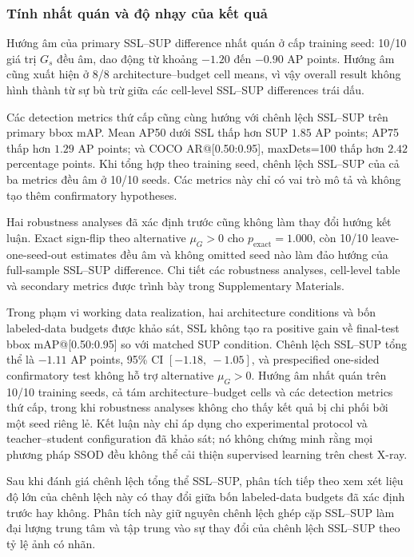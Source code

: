 \documentclass[pdflatex,sn-mathphys-num]{sn-jnl}%
\theoremstyle{thmstyleone}%
\theoremstyle{thmstyletwo}%
\theoremstyle{thmstylethree}%
\begin{document}
\subsubsection{Tính nhất quán và độ nhạy của kết quả}

Hướng âm của primary SSL--SUP difference nhất quán ở cấp training seed: 10/10 giá trị $G_s$ đều âm, dao động từ khoảng $-1.20$ đến $-0.90$ AP points. Hướng âm cũng xuất hiện ở 8/8 architecture--budget cell means, vì vậy overall result không hình thành từ sự bù trừ giữa các cell-level SSL--SUP differences trái dấu.

Các detection metrics thứ cấp cũng cùng hướng với chênh lệch SSL--SUP trên primary bbox mAP. Mean AP50 dưới SSL thấp hơn SUP \(1.85\) AP points;
AP75 thấp hơn \(1.29\) AP points; và COCO
AR@[0.50:0.95], maxDets=100 thấp hơn \(2.42\)
percentage points. Khi tổng hợp theo training seed, chênh lệch SSL--SUP của cả ba metrics đều âm ở 10/10 seeds. Các metrics này chỉ có vai trò mô tả và không tạo thêm confirmatory hypotheses.

Hai robustness analyses đã xác định trước cũng không làm thay đổi hướng kết luận. Exact sign-flip theo alternative $\mu_G>0$ cho $p_{\mathrm{exact}}=1.000$, còn 10/10 leave-one-seed-out estimates đều âm và không omitted seed nào làm đảo hướng của full-sample SSL--SUP difference. Chi tiết các robustness analyses, cell-level table và secondary metrics được trình bày trong Supplementary Materials.

Trong phạm vi working data realization, hai architecture conditions và bốn labeled-data budgets được khảo sát, SSL không tạo ra positive gain về final-test bbox mAP@[0.50:0.95]
so với matched SUP condition. Chênh lệch SSL--SUP tổng thể là $-1.11$ AP points, 95\% CI $[-1.18,\ -1.05]$, và prespecified one-sided confirmatory test không hỗ trợ alternative $\mu_G>0$. Hướng âm nhất quán trên 10/10 training seeds, cả tám architecture--budget cells và các detection metrics thứ cấp, trong khi robustness analyses không cho thấy kết quả bị chi phối bởi một seed riêng lẻ. Kết luận này chỉ áp dụng cho experimental protocol và teacher--student configuration đã khảo sát; nó không chứng minh rằng mọi phương pháp SSOD đều không thể cải thiện supervised learning trên chest X-ray.

Sau khi đánh giá chênh lệch tổng thể SSL--SUP, phân tích tiếp theo xem xét liệu
độ lớn của chênh lệch này có thay đổi giữa bốn labeled-data budgets đã xác định
trước hay không. Phân tích này giữ nguyên chênh lệch ghép cặp SSL--SUP làm đại lượng
trung tâm và tập trung vào sự thay đổi của chênh lệch SSL--SUP theo tỷ lệ ảnh có nhãn.
\end{document}

